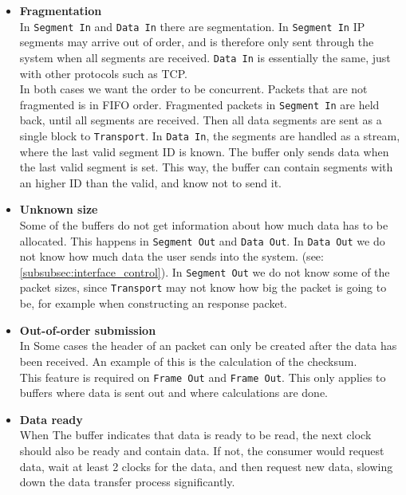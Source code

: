 \begin{itemize}
    \item \textbf{Fragmentation}\\
    In \texttt{Segment In} and \texttt{Data In} there are segmentation. In
    \texttt{Segment In} IP segments may arrive out of order, and is therefore only
    sent through the system when all segments are received. \texttt{Data In} is
    essentially the same, just with other protocols such as TCP.\\
    In both cases we want the order to be concurrent. Packets that are not
    fragmented is in FIFO order. Fragmented packets in \texttt{Segment In} are
    held back, until all segments are received. Then all data segments are sent
    as a single block to \texttt{Transport}. In \texttt{Data In}, the segments are
    handled as a stream, where the last valid segment ID is known. The buffer
    only sends data when the last valid segment is set. This way, the buffer
    can contain segments with an higher ID than the valid, and know not to send it.


    \item \textbf{Unknown size}\\
    Some of the buffers do not get information about how much data has to be
    allocated. This happens in \texttt{Segment Out} and \texttt{Data Out}.
    In \texttt{Data Out} we do not know how much data the user sends into
    the system. (see: \autoref{subsubsec:interface_control}). In
    \texttt{Segment Out} we do not know some of the packet sizes, since
    \texttt{Transport} may not know how big the packet is going to be, for
    example when constructing an response packet.


    \item \textbf{Out-of-order submission}\\
    In Some cases the header of an packet can only be created after the data
    has been received. An example of this is the calculation of the checksum.\\
    This feature is required on \texttt{Frame Out} and \texttt{Frame Out}.
    This only applies to buffers where data is sent out and where calculations
    are done.

    \item \textbf{Data ready}\\
    When The buffer indicates that data is ready to be read, the next clock
    should also be ready and contain data. If not, the consumer would request
    data, wait at least 2 clocks for the data, and then request new data,
    slowing down the data transfer process significantly.

\end{itemize}
